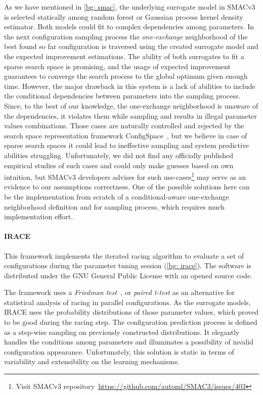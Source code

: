 As we have mentioned in \cref{bg: smac}, the underlying surrogate model in SMACv3 is selected statically among random forest or Gaussian process kernel density estimator. Both models could fit to complex dependencies among parameters. In the next configuration sampling process the \emph{one-exchange} neighborhood of the best found so far configuration is traversed using the created surrogate model and the expected improvement estimations. The ability of both surrogates to fit a sparse search space is promising, and the usage of expected improvement guarantees to converge the search process to the global optimum given enough time. However, the major drawback in this system is a lack of abilities to include the conditional dependencies between parameters into the sampling process. Since, to the best of our knowledge, the one-exchange neighborhood is unaware of the dependencies, it violates them while sampling and results in illegal parameter values combinations. Those cases are naturally controlled and rejected by the search space representation framework ConfigSpace~\cite{configspace}, but we believe in case of sparse search spaces it could lead to ineffective sampling and system predictive abilities struggling. Unfortunately, we did not find any officially published empirical studies of such cases and could only make guesses based on own intuition, but SMACv3 developers advises for such use-cases\footnote{Visit SMACv3 repository~\url{https://github.com/automl/SMAC3/issues/403}} may serve as an evidence to our assumptions correctness. One of the possible solutions here can be the implementation from scratch of a conditional-aware one-exchange neighborhood definition and for sampling process, which requires much implementation effort.

\paragraph{IRACE} This framework implements the iterated racing algorithm to evaluate a set of configurations during the parameter tuning session (\cref{bg: irace}). The software is distributed under the GNU General Public License with an opened source code.

The framework uses a \emph{Friedman test}~\cite{conover1980practical}, or \emph{paired t-test} as an alternative for statistical analysis of racing in parallel configurations. As the surrogate models, IRACE uses the probability distributions of those parameter values, which proved to be good during the racing step. The configuration prediction process is defined as a step-wise sampling on previously constructed distributions. It elegantly handles the conditions among parameters and illuminates a possibility of invalid configuration appearance. Unfortunately, this solution is static in terms of variability and extensibility on the learning mechanisms.

